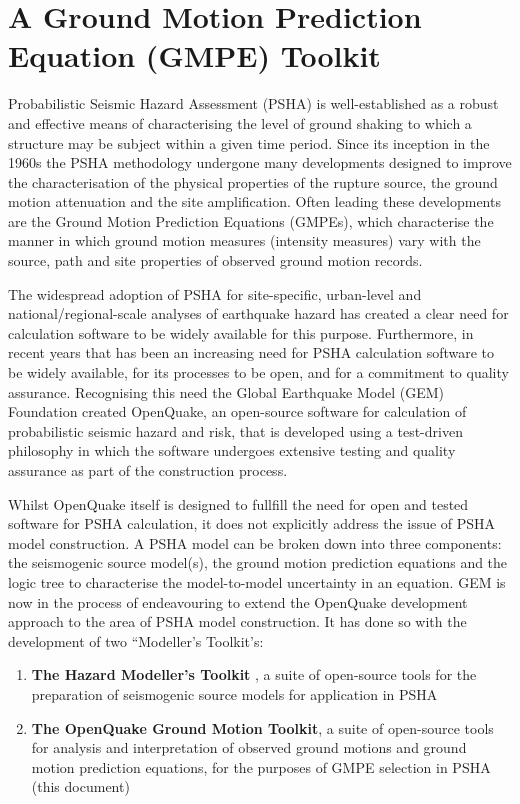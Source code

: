 \section{A Ground Motion Prediction Equation (GMPE) Toolkit}
\label{sec:gmpe_toolkit}

Probabilistic Seismic Hazard Assessment (PSHA) is well-established as a robust and effective means of characterising the level of ground shaking to which a structure may be subject within a given time period. Since its inception in the 1960s the PSHA methodology undergone many developments designed to improve the characterisation of the physical properties of the rupture source, the ground motion attenuation and the site amplification. Often leading these developments are the Ground Motion Prediction Equations (GMPEs), which characterise the manner in which ground motion measures (intensity measures) vary with the source, path and site properties of observed ground motion records. 

The widespread adoption of PSHA for site-specific, urban-level and national/regional-scale analyses of earthquake hazard has created a clear need for calculation software to be widely available for this purpose. Furthermore, in recent years that has been an increasing need for PSHA calculation software to be widely available, for its processes to be open, and for a commitment to quality assurance. Recognising this need the Global Earthquake Model (GEM) Foundation created OpenQuake, an open-source software for calculation of probabilistic seismic hazard and risk, that is developed using a test-driven philosophy in which the software undergoes extensive testing and quality assurance as part of the construction process. 

Whilst OpenQuake itself is designed to fullfill the need for open and tested software for PSHA calculation, it does not explicitly address the issue of PSHA model construction. A PSHA model can be broken down into three components: the seismogenic source model(s), the ground motion prediction equations and the logic tree to characterise the model-to-model uncertainty in an equation. GEM is now in the process of endeavouring to extend the OpenQuake development approach to the area of PSHA model construction. It has done so with the development of two ``Modeller's Toolkit's: 

\begin{enumerate}
\item \textbf{The Hazard Modeller's Toolkit} , a suite of open-source tools for the preparation of seismogenic source models for application in PSHA \cite{hmtk_guide}
\item \textbf{The OpenQuake Ground Motion Toolkit}, a suite of open-source tools for analysis and interpretation of observed ground motions and ground motion prediction equations, for the purposes of GMPE selection in PSHA (this document)
\end{enumerate}

